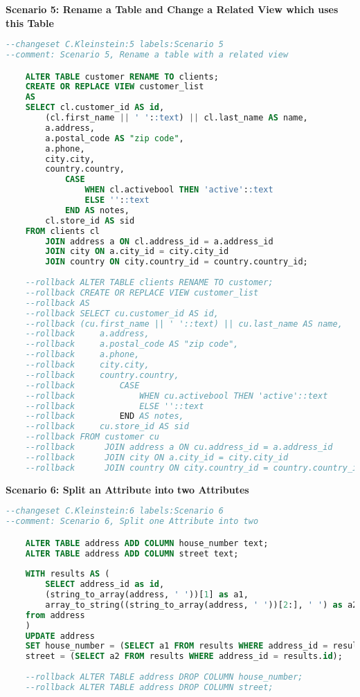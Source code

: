 \newpage
\textbf{Scenario 5: Rename a Table and Change a Related View which uses this Table}\\
%
\begin{lstlisting}[language=SQL, caption={SQL Changeset Scenario 5: Rename a Table and Change a Related View which uses this Table}, label=list:scenarions:LiquibaseSQLScen5]
--changeset C.Kleinstein:5 labels:Scenario 5 
--comment: Scenario 5, Rename a table with a related view

	ALTER TABLE customer RENAME TO clients;
	CREATE OR REPLACE VIEW customer_list
	AS
	SELECT cl.customer_id AS id,
		(cl.first_name || ' '::text) || cl.last_name AS name,
		a.address,
		a.postal_code AS "zip code",
		a.phone,
		city.city,
		country.country,
			CASE
				WHEN cl.activebool THEN 'active'::text
				ELSE ''::text
			END AS notes,
		cl.store_id AS sid
	FROM clients cl
		JOIN address a ON cl.address_id = a.address_id
		JOIN city ON a.city_id = city.city_id
		JOIN country ON city.country_id = country.country_id;
	
	--rollback ALTER TABLE clients RENAME TO customer; 
	--rollback CREATE OR REPLACE VIEW customer_list
	--rollback AS
	--rollback SELECT cu.customer_id AS id,
	--rollback (cu.first_name || ' '::text) || cu.last_name AS name,
	--rollback     a.address,
	--rollback     a.postal_code AS "zip code",
	--rollback     a.phone,
	--rollback     city.city,
	--rollback     country.country,
	--rollback         CASE
	--rollback             WHEN cu.activebool THEN 'active'::text
	--rollback             ELSE ''::text
	--rollback         END AS notes,
	--rollback     cu.store_id AS sid
	--rollback FROM customer cu
	--rollback      JOIN address a ON cu.address_id = a.address_id
	--rollback      JOIN city ON a.city_id = city.city_id
	--rollback      JOIN country ON city.country_id = country.country_id;
\end{lstlisting}

\newpage
\textbf{Scenario 6: Split an Attribute into two Attributes}\\
%
\begin{lstlisting}[language=SQL, caption={SQL Changeset Scenario 6: Split an Attribute into two Attributes}, label=list:scenarions:LiquibaseSQLScen6]
--changeset C.Kleinstein:6 labels:Scenario 6
--comment: Scenario 6, Split one Attribute into two

	ALTER TABLE address ADD COLUMN house_number text;
	ALTER TABLE address ADD COLUMN street text;
	
	WITH results AS (
		SELECT address_id as id,
		(string_to_array(address, ' '))[1] as a1,
		array_to_string((string_to_array(address, ' '))[2:], ' ') as a2
	from address
	)
	UPDATE address
	SET house_number = (SELECT a1 FROM results WHERE address_id = results.id),
	street = (SELECT a2 FROM results WHERE address_id = results.id);
	
	--rollback ALTER TABLE address DROP COLUMN house_number;
	--rollback ALTER TABLE address DROP COLUMN street;
\end{lstlisting}

